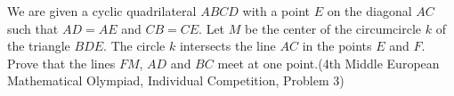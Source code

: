 We are given a cyclic quadrilateral $ABCD$ with a point $E$ on the diagonal $AC$ such that $AD=AE$ and $CB=CE$. Let $M$ be the center of the circumcircle $k$ of the triangle $BDE$. The circle $k$ intersects the line $AC$ in the points $E$ and $F$. Prove that the lines $FM$,  $AD$ and $BC$ meet at one point.(4th Middle European Mathematical Olympiad, Individual Competition, Problem 3)